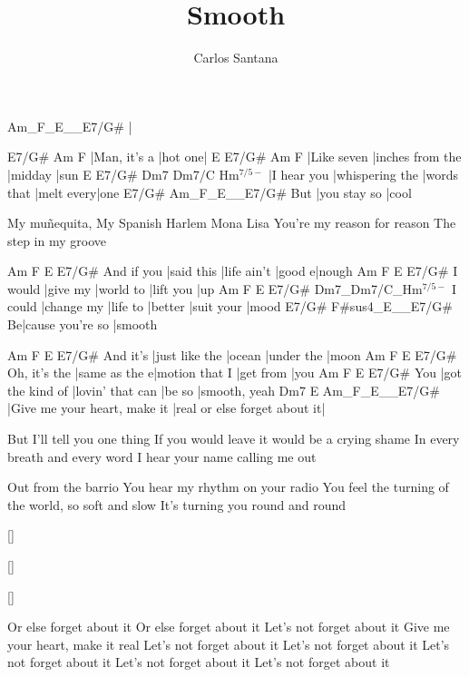 \documentclass{song}
\title{Smooth}
\author{Carlos Santana}
\renewcommand{\-}{$^{7/5-}$}
\begin{document}
\strophe
Am_F_E__E7/G#
|
\endstrophe

\strophe
E7/G#        Am      F
|Man, it's a |hot one|
E           E7/G#            Am      F
|Like seven |inches from the |midday |sun
E           E7/G#           Dm7         Dm7/C      Hm\-
|I hear you |whispering the |words that |melt every|one
    E7/G#        Am_F_E__E7/G#
But |you stay so |cool
\endstrophe

\strophe*
My muñequita,
My Spanish Harlem Mona Lisa
You're my reason for reason
The step in my groove
\endstrophe

           Am         F           E      E7/G#
And if you |said this |life ain't |good e|nough
        Am       F         E         E7/G#
I would |give my |world to |lift you |up
        Am         F        E       E7/G#      Dm7_Dm7/C_Hm\-
I could |change my |life to |better |suit your |mood
  E7/G#            F#sus4_E__E7/G#
Be|cause you're so |smooth
\endstrophe

\varrefrain
         Am             F      E          E7/G#
And it's |just like the |ocean |under the |moon
             Am            F              E         E7/G#
Oh, it's the |same as the e|motion that I |get from |you
    Am               F                E      E7/G#
You |got the kind of |lovin' that can |be so |smooth, yeah
Dm7                          E                            Am_F_E__E7/G#
|Give me your heart, make it |real or else forget about it|
\endstrophe

\strophe*
But I'll tell you one thing
If you would leave it would be a crying shame
In every breath and every word I hear your name
calling me out
\endstrophe

\strophe*
Out from the barrio
You hear my rhythm on your radio
You feel the turning of the world, so soft and slow
It's turning you round and round
\endstrophe


\ref{}

\ref*{}

\ref*{}


\strophe*
Or else forget about it
Or else forget about it
Let's not forget about it
Give me your heart, make it real
Let's not forget about it
Let's not forget about it
Let's not forget about it
Let's not forget about it
Let's not forget about it
\endstrophe

\end{document}
